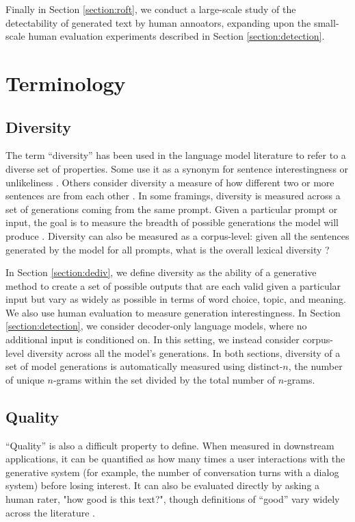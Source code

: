 Finally in Section \ref{section:roft}, we conduct a large-scale study of the detectability of generated text by human annoators, expanding upon the small-scale human evaluation experiments described in Section \ref{section:detection}.

\section{Terminology}
\subsection{Diversity}
The term ``diversity'' has been used in the language model literature to refer to a diverse set of properties.
Some use it as a synonym for sentence interestingness or unlikeliness \citep{tatsunori2019unifying}.
Others consider diversity a measure of how different two or more sentences are from each other \citep{vijayakumar2016diverse,gimpel2013systematic}.
In some framings, diversity is measured across a set of generations coming from the same prompt.
Given a particular prompt or input, the goal is to measure the breadth of possible generations the model will produce \citep{mayhew2020simultaneous}.
Diversity can also be measured as a corpus-level: given all the sentences generated by the model for all prompts, what is the overall lexical diversity ?

In Section \ref{section:dediv}, we define diversity as the ability of a generative method to create a set of possible outputs that are each valid given a particular input but vary as widely as possible in terms of word choice, topic, and meaning.
We also use human evaluation to measure generation interestingness.
In Section \ref{section:detection}, we consider decoder-only language models, where no additional input is conditioned on.
In this setting, we instead consider corpus-level diversity across all the model's generations.
In both sections, diversity of a set of model generations is automatically measured using distinct-$n$, the number of unique $n$-grams within the set divided by the total number of $n$-grams.

\subsection{Quality}
``Quality'' is also a difficult property to define.
When measured in downstream applications, it can be quantified as how many times a user interactions with the generative system (for example, the number of conversation turns with a dialog system) before losing interest.
It can also be evaluated directly by asking a human rater, "how good is this text?", though definitions of ``good'' vary widely across the literature .

